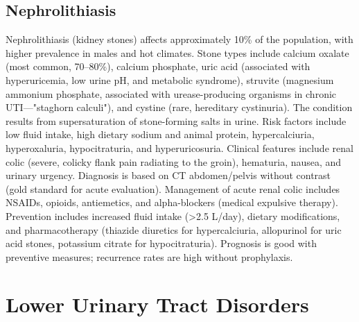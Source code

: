 

\label{sec:Kidney Stones}

\subsection{Nephrolithiasis}
\label{sec:Nephrolithiasis}
Nephrolithiasis (kidney stones) affects approximately 10\% of the population, with higher prevalence in males and hot climates. Stone types include calcium oxalate (most common, 70--80\%), calcium phosphate, uric acid (associated with hyperuricemia, low urine pH, and metabolic syndrome), struvite (magnesium ammonium phosphate, associated with urease-producing organisms in chronic UTI---"staghorn calculi"), and cystine (rare, hereditary cystinuria). The condition results from supersaturation of stone-forming salts in urine. Risk factors include low fluid intake, high dietary sodium and animal protein, hypercalciuria, hyperoxaluria, hypocitraturia, and hyperuricosuria. Clinical features include renal colic (severe, colicky flank pain radiating to the groin), hematuria, nausea, and urinary urgency. Diagnosis is based on CT abdomen/pelvis without contrast (gold standard for acute evaluation). Management of acute renal colic includes NSAIDs, opioids, antiemetics, and alpha-blockers (medical expulsive therapy). Prevention includes increased fluid intake (>2.5 L/day), dietary modifications, and pharmacotherapy (thiazide diuretics for hypercalciuria, allopurinol for uric acid stones, potassium citrate for hypocitraturia). Prognosis is good with preventive measures; recurrence rates are high without prophylaxis.

\section{Lower Urinary Tract Disorders}




